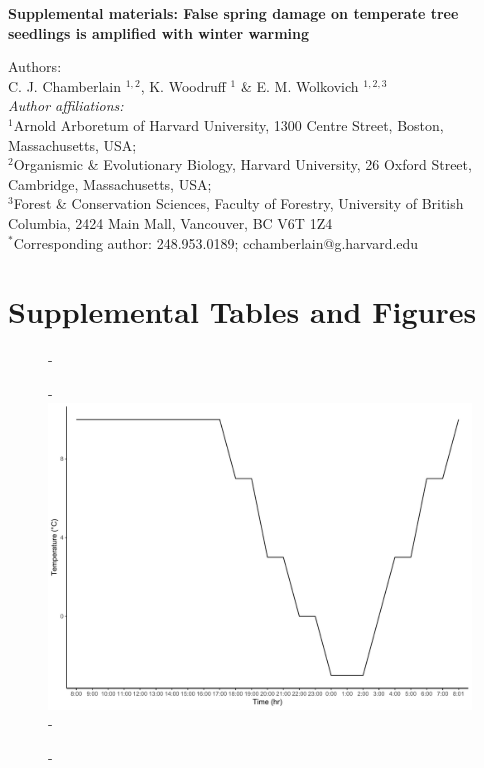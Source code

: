\documentclass{article}\usepackage[]{graphicx}\usepackage[]{color}
\begin{document}
\noindent \textbf{\Large{Supplemental materials: False spring damage on temperate tree seedlings is amplified with winter warming}}

\noindent Authors:\\
C. J. Chamberlain $^{1,2}$, K. Woodruff $^{1}$ \& E. M. Wolkovich $^{1,2,3}$
\vspace{2ex}\\
\emph{Author affiliations:}\\
$^{1}$Arnold Arboretum of Harvard University, 1300 Centre Street, Boston, Massachusetts, USA; \\
$^{2}$Organismic \& Evolutionary Biology, Harvard University, 26 Oxford Street, Cambridge, Massachusetts, USA; \\
$^{3}$Forest \& Conservation Sciences, Faculty of Forestry, University of British Columbia, 2424 Main Mall, Vancouver, BC V6T 1Z4\\
\vspace{2ex}
$^*$Corresponding author: 248.953.0189; cchamberlain@g.harvard.edu\\

\renewcommand{\thetable}{S\arabic{table}}
\renewcommand{\thefigure}{S\arabic{figure}}
\renewcommand{\labelitemi}{$-$}

\section*{Supplemental Tables and Figures}




{\begin{figure} [H]
  -\begin{center}
  -\includegraphics[width=12cm]{..//analyses/figures/growthchamber.pdf}%
  -\end{center}
  -\end{figure}}
\end{document}
